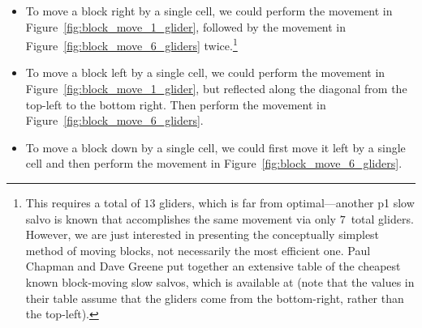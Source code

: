 \begin{itemize}
	\item To move a block right by a single cell, we could perform the movement in Figure~\ref{fig:block_move_1_glider}, followed by the movement in Figure~\ref{fig:block_move_6_gliders} twice.\footnote{This requires a total of $13$ gliders, which is far from optimal---another p1 slow salvo is known that accomplishes the same movement via only $7$~total gliders. However, we are just interested in presenting the conceptually simplest method of moving blocks, not necessarily the most efficient one. Paul Chapman and Dave Greene put together an extensive table of the cheapest known block-moving slow salvos, which is available at  (note that the values in their table assume that the gliders come from the bottom-right, rather than the top-left).}\smallskip
	
	\item To move a block left by a single cell, we could perform the movement in Figure~\ref{fig:block_move_1_glider}, but reflected along the diagonal from the top-left to the bottom right. Then perform the movement in Figure~\ref{fig:block_move_6_gliders}.\smallskip
	
	\item To move a block down by a single cell, we could first move it left by a single cell and then perform the movement in Figure~\ref{fig:block_move_6_gliders}.\smallskip
\end{itemize}

